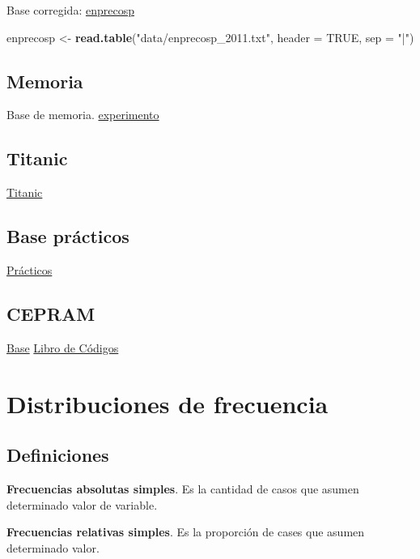 \documentclass[spanish,]{book}
\newenvironment{Shaded}{\begin{snugshade}}{\end{snugshade}}
\newcommand{\KeywordTok}[1]{\textcolor[rgb]{0.13,0.29,0.53}{\textbf{#1}}}
\newcommand{\DataTypeTok}[1]{\textcolor[rgb]{0.13,0.29,0.53}{#1}}
\newcommand{\StringTok}[1]{\textcolor[rgb]{0.31,0.60,0.02}{#1}}
\newcommand{\OtherTok}[1]{\textcolor[rgb]{0.56,0.35,0.01}{#1}}
\newcommand{\NormalTok}[1]{#1}
\begin{document}
Base corregida: \href{data/enprecosp_2011.txt}{enprecosp}

\begin{Shaded}
\begin{Highlighting}[]
\NormalTok{enprecosp <-}\StringTok{ }\KeywordTok{read.table}\NormalTok{(}\StringTok{"data/enprecosp_2011.txt"}\NormalTok{, }\DataTypeTok{header =} \OtherTok{TRUE}\NormalTok{, }\DataTypeTok{sep =} \StringTok{"|"}\NormalTok{)}
\end{Highlighting}
\end{Shaded}

\section{Memoria}\label{memoria}

Base de memoria. \href{data/EXP1.xls}{experimento}

\section{Titanic}\label{titanic}

\href{data/titanic.csv}{Titanic}

\section{Base prácticos}\label{base-practicos}

\href{data/base2019.txt}{Prácticos}

\section{CEPRAM}\label{cepram}

\href{data/cepram.csv}{Base}
\href{data/cuestionario/CEPRAM_libro_codigo.pdf}{Libro de Códigos}

\chapter{Distribuciones de frecuencia}\label{frec}

\section{Definiciones}\label{definiciones}

\textbf{Frecuencias absolutas simples}. Es la cantidad de casos que
asumen determinado valor de variable.

\textbf{Frecuencias relativas simples}. Es la proporción de cases que
asumen determinado valor.
\end{document}
